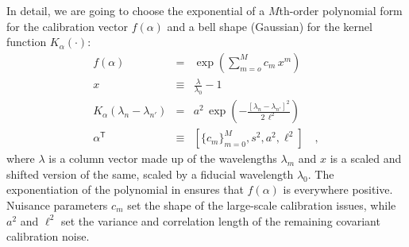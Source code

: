 \documentclass[iop,numberedappendix]{emulateapj}
\newcommand{\transpose}[1]{{#1}^{\!\mathsf T}}
\newcommand{\given}{\,|\,}
\renewcommand{\det}[1]{||{#1}||}
\begin{document}
In detail, we are going to choose the exponential of a $M$th-order
polynomial form for the calibration vector $f(\alpha)$ and a bell
shape (Gaussian) for the kernel function $K_\alpha(\cdot)$:
\begin{eqnarray}\displaystyle
f(\alpha) &=& \exp\left(\sum_{m=o}^M c_m\,x^m\right)
\\
x &\equiv& \frac{\lambda}{\lambda_0} - 1
\\
K_\alpha(\lambda_n - \lambda_{n'}) &=& a^2\,\exp\left(-\frac{[\lambda_n - \lambda_{n'}]^2}{2\,\ell^2}\right)
\\
\transpose{\alpha} &\equiv& \left[ \{c_m\}_{m=0}^M, s^2, a^2, \ell^2 \right]
\quad ,
\end{eqnarray}
where $\lambda$ is a column vector made up of the wavelengths
$\lambda_m$ and $x$ is a scaled and shifted version of the same,
scaled by a fiducial wavelength $\lambda_0$.  The exponentiation of
the polynomial in ensures that $f(\alpha)$ is everywhere positive.
Nuisance parameters $c_m$ set the shape of the large-scale calibration
issues, while $a^2$ and $\ell^2$ set the variance and correlation
length of the remaining covariant calibration noise.


\end{document}
